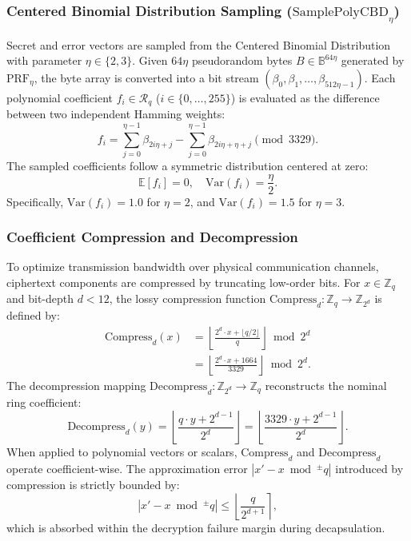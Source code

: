 \subsubsection{Centered Binomial Distribution Sampling (\texorpdfstring{$\text{SamplePolyCBD}_\eta$}{SamplePolyCBD\_\textbackslash eta})}
Secret and error vectors are sampled from the Centered Binomial Distribution with parameter $\eta \in \{2, 3\}$. Given $64\eta$ pseudorandom bytes $B \in \mathbb{B}^{64\eta}$ generated by $\text{PRF}_\eta$, the byte array is converted into a bit stream $(\beta_0, \beta_1, \dots, \beta_{512\eta - 1})$. Each polynomial coefficient $f_i \in \mathcal{R}_q$ ($i \in \{0, \dots, 255\}$) is evaluated as the difference between two independent Hamming weights:
\begin{equation}
\label{eq:cbd_formulation}
f_i = \sum_{j=0}^{\eta-1} \beta_{2i\eta + j} - \sum_{j=0}^{\eta-1} \beta_{2i\eta + \eta + j} \pmod{3329}.
\end{equation}
The sampled coefficients follow a symmetric distribution centered at zero:
\begin{equation}
\label{eq:cbd_stats}
\mathbb{E}[f_i] = 0, \quad \text{Var}(f_i) = \frac{\eta}{2}.
\end{equation}
Specifically, $\text{Var}(f_i) = 1.0$ for $\eta = 2$, and $\text{Var}(f_i) = 1.5$ for $\eta = 3$.

\subsubsection{Coefficient Compression and Decompression}
To optimize transmission bandwidth over physical communication channels, ciphertext components are compressed by truncating low-order bits. For $x \in \mathbb{Z}_q$ and bit-depth $d < 12$, the lossy compression function $\text{Compress}_d: \mathbb{Z}_q \to \mathbb{Z}_{2^d}$ is defined by:
\begin{equation}
\label{eq:compress_def}
\begin{aligned}
\text{Compress}_d(x) &= \left\lfloor \frac{2^d \cdot x + \lfloor q/2 \rfloor}{q} \right\rfloor \bmod 2^d \\
&= \left\lfloor \frac{2^d \cdot x + 1664}{3329} \right\rfloor \bmod 2^d.
\end{aligned}
\end{equation}
The decompression mapping $\text{Decompress}_d: \mathbb{Z}_{2^d} \to \mathbb{Z}_q$ reconstructs the nominal ring coefficient:
\begin{equation}
\label{eq:decompress_def}
\text{Decompress}_d(y) = \left\lfloor \frac{q \cdot y + 2^{d-1}}{2^d} \right\rfloor = \left\lfloor \frac{3329 \cdot y + 2^{d-1}}{2^d} \right\rfloor.
\end{equation}
When applied to polynomial vectors or scalars, $\text{Compress}_d$ and $\text{Decompress}_d$ operate coefficient-wise. The approximation error $|x' - x \bmod^{\pm} q|$ introduced by compression is strictly bounded by:
\begin{equation}
\label{eq:compress_error_bound}
|x' - x \bmod^{\pm} q| \le \left\lfloor \frac{q}{2^{d+1}} \right\rceil,
\end{equation}
which is absorbed within the decryption failure margin during decapsulation.

